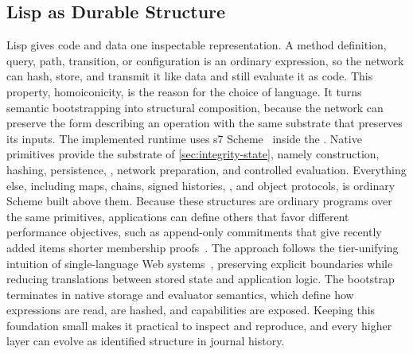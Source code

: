 \subsection{Lisp as Durable Structure}
\label{sec:lisp-structure}

Lisp gives code and data one inspectable representation. A method definition, query, path, transition, or configuration is an ordinary expression, so the network can hash, store, and transmit it like data and still evaluate it as code. This property, homoiconicity, is the reason for the choice of language. It turns semantic bootstrapping into structural composition, because the network can preserve the form describing an operation with the same substrate that preserves its inputs. The implemented runtime uses s7 Scheme~\cite{Schottstaedt2024s7} inside the . Native primitives provide the substrate of \cref{sec:integrity-state}, namely construction, hashing, persistence, , network preparation, and controlled evaluation. Everything else, including maps, chains, signed histories, , and object protocols, is ordinary Scheme built above them. Because these structures are ordinary programs over the same primitives, applications can define others that favor different performance objectives, such as append-only commitments that give recently added items shorter membership proofs~\cite{Cevallos2025merkle}. The approach follows the tier-unifying intuition of single-language Web systems~\cite{Cooper2007links}, preserving explicit boundaries while reducing translations between stored state and application logic. The bootstrap terminates in native storage and evaluator semantics, which define how expressions are read,  are hashed, and capabilities are exposed. Keeping this foundation small makes it practical to inspect and reproduce, and every higher layer can evolve as identified structure in journal history.

